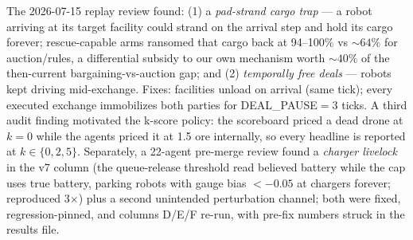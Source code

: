 \documentclass[sigconf,nonacm]{acmart}
\begin{document}
The 2026-07-15 replay review found: (1) a \emph{pad-strand cargo trap} ---
a robot arriving at its target facility could strand on the arrival step
and hold its cargo forever; rescue-capable arms ransomed that cargo back at
94--100\% vs ${\sim}64\%$ for auction/rules, a differential subsidy to our
own mechanism worth ${\sim}40\%$ of the then-current bargaining-vs-auction
gap; and (2) \emph{temporally free deals} --- robots kept driving
mid-exchange. Fixes: facilities unload on arrival (same tick); every
executed exchange immobilizes both parties for DEAL\_PAUSE${=}3$ ticks. A
third audit finding motivated the k-score policy: the scoreboard priced a
dead drone at $k{=}0$ while the agents priced it at 1.5 ore internally, so
every headline is reported at $k \in \{0, 2, 5\}$. Separately, a 22-agent
pre-merge review found a \emph{charger livelock} in the v7 column (the
queue-release threshold read believed battery while the cap uses true
battery, parking robots with gauge bias $< -0.05$ at chargers forever;
reproduced 3$\times$) plus a second unintended perturbation channel; both
were fixed, regression-pinned, and columns D/E/F re-run, with pre-fix
numbers struck in the results file.

\nocite{brambilla2013swarm,hamann2018swarm}



\end{document}

